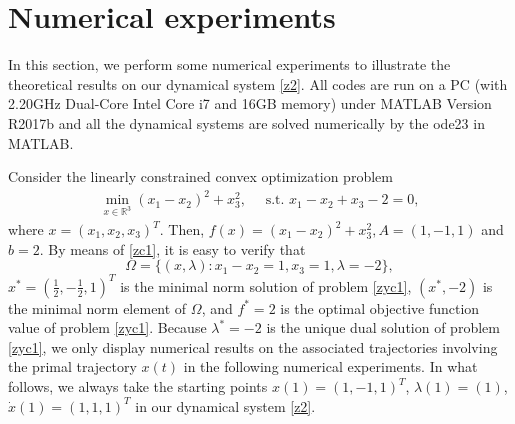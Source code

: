 \documentclass[review]{elsarticle}
\newtheorem{corollary}{Corollary}[section]
\newtheorem{remark}{Remark}[section]
\begin{document}
	
	



	
	\section{Numerical experiments}

	In this section, we perform some numerical experiments to illustrate the theoretical results on our dynamical system \eqref{z2}. All codes are run on a PC (with 2.20GHz Dual-Core Intel Core i7 and 16GB memory) under MATLAB Version R2017b and  all the
dynamical systems are solved numerically by the ode23 in MATLAB.
	
	Consider the linearly constrained convex optimization problem
	\begin{eqnarray}\label{zyc1}
		\min_{x\in\mathbb{R}^3} (x_1-x_2)^2+x_{3}^2, \quad\text{ s.t. }x_1-x_2+x_3-2=0,
	\end{eqnarray}
	where $x=(x_1,x_2,x_3)^T$. Then,  $f(x)= (x_1-x_2)^2+x_{3}^2, A=(1,-1,1)$ and $b=2$. By  means of \eqref{zc1}, it is easy to verify that 
$$\Omega=\{(x,\lambda): x_1-x_2=1, x_3=1,\lambda=-2\},$$
 $x^*=\left(\frac{1}{2},-\frac{1}{2},1\right)^T$ is the minimal norm solution of problem \eqref{zyc1},  $(x^*,-2)$ is the minimal norm element of $\Omega$, and  $f^*=2$ is the optimal objective function value of  problem \eqref{zyc1}. Because $\lambda^*=-2$ is the unique dual solution of problem \eqref{zyc1}, we only display  numerical results on the associated trajectories involving the primal trajectory $x(t)$ in the following  numerical experiments. In what follows, we always take the starting points $x(1)=(1,-1,1)^T$, $\lambda(1)=(1)$, $\dot{x}(1)=(1,1,1)^T$ in our dynamical system \eqref{z2}.
\end{document}
